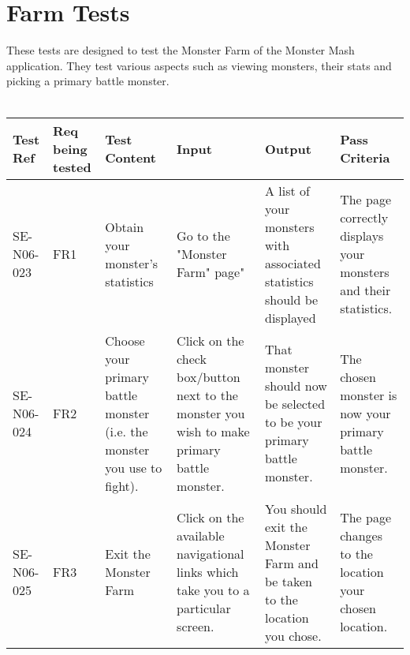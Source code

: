 \documentclass[titlepage]{article}
\begin{document}
\section{Farm Tests} 
These tests are designed to test the Monster Farm of the Monster Mash application. They test various aspects such as viewing monsters, their stats and picking a primary battle monster.\\
\\
\begin{tabular}{|p{1cm}|p{1cm}|p{3cm}|p{2cm}|p{2cm}|p{3cm}|}
\hline
Test Ref & Req being tested & Test Content & Input & Output & Pass Criteria \\ 
\hline
SE-N06-023 & FR1 & Obtain your monster's statistics & Go to the "Monster Farm" page" & A list of your monsters with associated statistics should be displayed & The page correctly displays your monsters and their statistics. \\ 
\hline
SE-N06-024 & FR2 & Choose your primary battle monster (i.e. the monster you use to fight). & Click on the check box/button next to the monster you wish to make primary battle monster. & That monster should now be selected to be your primary battle monster.& The chosen monster is now your primary battle monster.\\ 
\hline 
SE-N06-025 & FR3 & Exit the Monster Farm & Click on the available navigational links which take you to a particular screen. & You should exit the Monster Farm and be taken to the location you chose. & The page changes to the location your chosen location. \\ 
\hline 
\end{tabular}
\end{document}
